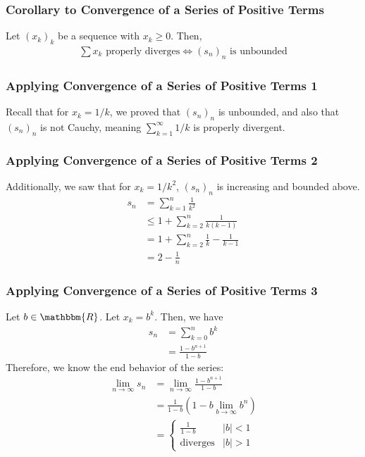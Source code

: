\documentclass[10pt]{extarticle}
\newcommand{\R}{\mathbbm{R}}
\begin{document}
    \subsubsection{Corollary to Convergence of a Series of Positive Terms}%
      Let $(x_k)_k$ be a sequence with $x_k \geq 0$. Then,
      \begin{align*}
        \sum x_k \text{ properly diverges} \Leftrightarrow (s_n)_n \text{ is unbounded}
      \end{align*}
    \subsubsection{Applying Convergence of a Series of Positive Terms 1}%
      Recall that for $x_k = 1/k$, we proved that $(s_n)_n$ is unbounded, and also that $(s_n)_n$ is not Cauchy, meaning $\sum_{k=1}^{\infty}1/k$ is properly divergent.\\
    \subsubsection{Applying Convergence of a Series of Positive Terms 2}%
      Additionally, we saw that for $x_k = 1/k^2$, $(s_n)_n$ is increasing and bounded above.
      \begin{align*}
        s_n &= \sum_{k=1}^{n}\frac{1}{k^2}\\
            &\leq 1 + \sum_{k=2}^{n}\frac{1}{k(k-1)}\\
            &= 1 + \sum_{k=2}^{n}\frac{1}{k} - \frac{1}{k-1}\\
            &= 2 - \frac{1}{n}
      \end{align*}
    \subsubsection{Applying Convergence of a Series of Positive Terms 3}%
      Let $b\in\R$. Let $x_k = b^k$. Then, we have
      \begin{align*}
        s_n &= \sum_{k=0}^{n}b^k\\
            &= \frac{1-b^{n+1}}{1-b} \tag*{$b\neq 1$}
      \end{align*}
      Therefore, we know the end behavior of the series:
      \begin{align*}
        \lim_{n\rightarrow\infty} s_n &= \lim_{n\rightarrow\infty} \frac{1-b^{n+1}}{1-b}\\
                                      &= \frac{1}{1-b} \left(1-b\lim_{b\rightarrow\infty}b^{n}\right)\\
                                      &= \begin{cases}
                                        \frac{1}{1-b} & |b| < 1\\
                                        \text{diverges} & |b| > 1
                                      \end{cases}
      \end{align*}
\end{document}
